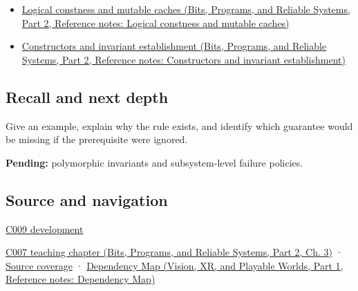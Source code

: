 \hypertarget{appendix-8e5214819615-used-by}{}

\begin{itemize}
\tightlist
\item
  \href{../01-Bits-Programs-and-Reliable-Systems-P02/main.pdf\#appendix-f5593256bcaf}{Logical constness and mutable caches (Bits, Programs, and Reliable Systems, Part 2, Reference notes: Logical constness and mutable caches)}
\item
  \href{../01-Bits-Programs-and-Reliable-Systems-P02/main.pdf\#appendix-7f8ec83d0886}{Constructors and invariant establishment (Bits, Programs, and Reliable Systems, Part 2, Reference notes: Constructors and invariant establishment)}
\end{itemize}

\subsection{Recall and next depth}\label{appendix-8e5214819615-recall-and-next-depth}

\hypertarget{appendix-8e5214819615-recall-and-next-depth}{}

Give an example, explain why the rule exists, and identify which guarantee would be missing if the prerequisite were ignored.

\textbf{Pending:} polymorphic invariants and subsystem-level failure policies.

\subsection{Source and navigation}\label{appendix-8e5214819615-source-and-navigation}

\hypertarget{appendix-8e5214819615-source-and-navigation}{}

\hyperref[appendix-fd090d982a15-m009---parts-127-147]{C009 development}

\href{../01-Bits-Programs-and-Reliable-Systems-P02/main.pdf\#01-foundations-i-ch003-public-records-and-protected-invariants}{C007 teaching chapter (Bits, Programs, and Reliable Systems, Part 2, Ch. 3)} · \hyperref[appendix-fd090d982a15-m007---parts-101-112]{Source coverage} · \href{../07-Vision-XR-and-Playable-Worlds-P01/main.pdf\#appendix-4ad47bdd269a}{Dependency Map (Vision, XR, and Playable Worlds, Part 1, Reference notes: Dependency Map)}
